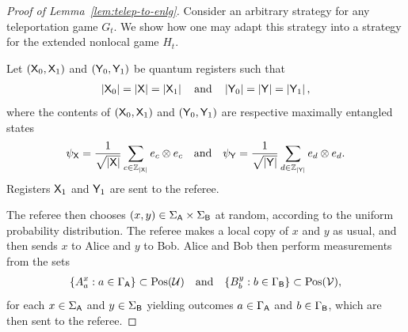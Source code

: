 \begin{proof}[Proof of Lemma~\ref{lem:telep-to-enlg}]
Consider an arbitrary strategy for any teleportation game $G_t$. We show how one may adapt this strategy into a strategy for the extended nonlocal game $H_t$. 

Let $(\mathsf{X}_0, \mathsf{X}_1)$ and $(\mathsf{Y}_0,\mathsf{Y}_1)$ be quantum registers such that
\begin{align}
	 \left\lvert \mathsf{X}_0 \right\rvert = \left\lvert \mathsf{X} \right\rvert = \left\lvert \mathsf{X}_1 \right\rvert \quad \textnormal{and} \quad  \left\lvert \mathsf{Y}_0 \right\rvert = \left\lvert \mathsf{Y} \right\rvert = \left\lvert \mathsf{Y}_1 \right\rvert,
\end{align}
where the contents of $(\mathsf{X}_0,\mathsf{X}_1)$ and $(\mathsf{Y}_0,\mathsf{Y}_1)$ are respective maximally entangled states 
\begin{align}
	\psi_{\mathsf{X}} = \frac{1}{\sqrt{\left\lvert \mathsf{X} \right\rvert}} \sum_{c \in \mathbb{Z}_{\left\lvert \mathsf{X} \right\rvert}} e_c \otimes e_c \quad \textnormal{and} \quad \psi_{\mathsf{Y}} = \frac{1}{\sqrt{\left\lvert \mathsf{Y} \right\rvert}} \sum_{d \in \mathbb{Z}_{\left\lvert \mathsf{Y} \right\rvert}} e_d \otimes e_d. 
\end{align}
Registers $\mathsf{X}_1$ and $\mathsf{Y}_1$ are sent to the referee. 

The referee then chooses $(x,y) \in \Sigma_{\mathsf{A}} \times \Sigma_{\mathsf{B}}$ at random, according to the uniform probability distribution. The referee makes a local copy of $x$ and $y$ as usual, and then sends $x$ to Alice and $y$ to Bob. Alice and Bob then perform measurements from the sets 
\begin{align}
	\{ A_a^x : a \in \Gamma_{\mathsf{A}} \} \subset \mathrm{Pos}(\mathcal{U}) \quad \textnormal{and} \quad \{B_b^y : b \in \Gamma_{\mathsf{B}} \} \subset \mathrm{Pos}(\mathcal{V}),
\end{align}
for each $x \in \Sigma_{\mathsf{A}}$ and $y \in \Sigma_{\mathsf{B}}$ yielding outcomes $a \in \Gamma_{\mathsf{A}}$ and $b \in \Gamma_{\mathsf{B}}$, which are then sent to the referee. 


\end{proof}
